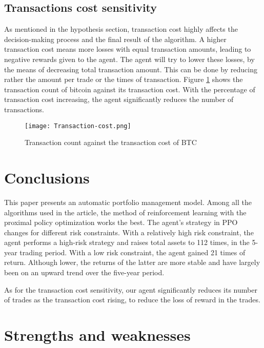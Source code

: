 \documentclass{mcmthesis}
\begin{document}
\subsection{Transactions cost sensitivity}

As mentioned in the hypothesis section, transaction cost highly affects the decision-making process and the final result of the algorithm.
A higher transaction cost means more losses with equal transaction amounts,
leading to negative rewards given to the agent.
The agent will try to lower these losses, by the means of decreasing total transaction amount.
This can be done by reducing rather the amount per trade or the times of transaction.
Figure \ref{Transaction-cost} shows the transaction count of bitcoin against its transaction cost.
With the percentage of transaction cost increasing, the agent significantly reduces the number of transactions.

\begin{figure}[h]
  \small
  \centering
  \texttt{[image: Transaction-cost.png]}
  \caption{Transaction count against the transaction cost of BTC}
  \label{Transaction-cost}
\end{figure}

\section{Conclusions}

This paper presents an automatic portfolio management model.
Among all the algorithms used in the article, the method of reinforcement learning with the proximal policy optimization works the best.
The agent's strategy in PPO changes for different risk constraints.
With a relatively high risk constraint, the agent performs a high-risk strategy and raises total assets to 112 times, in the 5-year trading period.
With a low risk constraint, the agent gained 21 times of return. Although lower, the returns of the latter are more stable and have largely been on an upward trend over the five-year period.

As for the transaction cost sensitivity, our agent significantly reduces its number of trades as the transaction cost rising, to reduce the loss of reward in the trades.

\section{Strengths and weaknesses}
\end{document}
